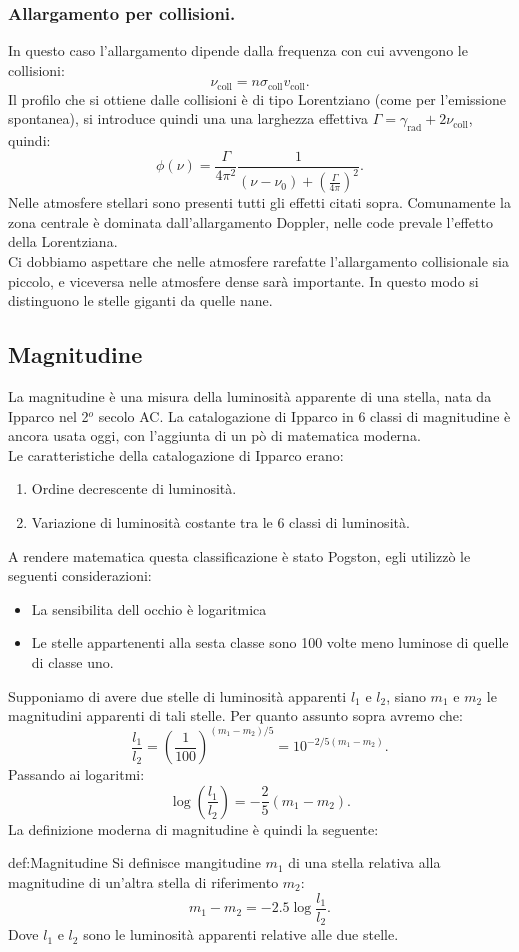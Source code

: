 \subsubsection{Allargamento per collisioni.}
\label{subsubsec:Allargamento per collisioni.}
In questo caso l'allargamento dipende dalla frequenza con cui avvengono le collisioni:
\[
	\nu _{\text{coll}} = n \sigma _{\text{coll}} v_{\text{coll}}
.\] 
Il profilo che si ottiene dalle collisioni è di tipo Lorentziano (come per l'emissione spontanea), si introduce quindi una una larghezza effettiva $\Gamma = \gamma _{\text{rad}} + 2 \nu _{\text{coll}}$, quindi:
\[
	\phi ( \nu ) = \frac{\Gamma }{4\pi^2}\frac{1}{\left( \nu -\nu_0 \right) + \left( \frac{\Gamma }{4\pi} \right) ^2}
.\] 
Nelle atmosfere stellari sono presenti tutti gli effetti citati sopra. Comunamente la zona centrale è dominata dall'allargamento Doppler, nelle code prevale l'effetto della Lorentziana.\\
Ci dobbiamo aspettare che nelle atmosfere rarefatte l'allargamento collisionale sia piccolo, e viceversa nelle atmosfere dense sarà importante. In questo modo si distinguono le stelle giganti da quelle nane.
\subsection{Magnitudine}%
La magnitudine è una misura della luminosità apparente di una stella, nata da Ipparco nel 2$^o$ secolo AC. La catalogazione di Ipparco in 6 classi di magnitudine è ancora usata oggi, con l'aggiunta di un pò di matematica moderna.\\
Le caratteristiche della catalogazione di Ipparco erano:
\begin{enumerate}
	\item Ordine decrescente di luminosità.
	\item Variazione di luminosità costante tra le 6 classi di luminosità.
\end{enumerate}
A rendere matematica questa classificazione è stato Pogston, egli utilizzò le seguenti considerazioni:
\begin{itemize}
	\item La sensibilita dell occhio è logaritmica
	\item Le stelle appartenenti alla sesta classe sono 100 volte meno luminose di quelle di classe uno.
\end{itemize}
Supponiamo di avere due stelle di luminosità apparenti $l_1$ e $l_2$, siano $m_1$ e $m_2$ le magnitudini apparenti di tali stelle. Per quanto assunto sopra avremo che:
\[
	\frac{l_1}{l_2}
	=
	\left( \frac{1}{100} \right) ^{\left( m_1-m_2 \right)/5}
	=
	10^{-2 /5 \left( m_1-m_2 \right) }
.\] 
Passando ai logaritmi:
\[
	\log \left( \frac{l_1}{l_2} \right) 
	=
	-\frac{2}{5}\left( m_1-m_2 \right) 
.\] 
La definizione moderna di magnitudine è quindi la seguente:
\begin{defn}[Magnitudine]{def:Magnitudine}
	Si definisce mangitudine $m_1$ di una stella relativa alla magnitudine di un'altra stella di riferimento $m_2$:
	\[
	m_1-m_2 = -2.5 \log \frac{l_1}{l_2}
	.\] 
	Dove $l_1$ e $l_2$ sono le luminosità apparenti relative alle due stelle.
\end{defn}

